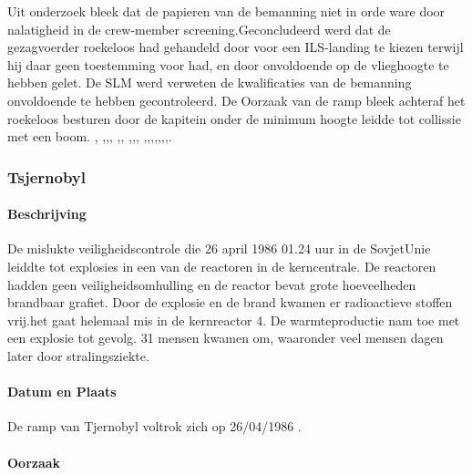 \documentclass{article}
\begin{document}
	Uit onderzoek bleek dat de papieren van de bemanning niet in orde ware door nalatigheid in de crew-member screening.Geconcludeerd werd dat de gezagvoerder roekeloos had gehandeld door voor een ILS-landing te kiezen terwijl hij daar geen toestemming voor had, en door onvoldoende op de vlieghoogte te hebben gelet. 
	De SLM werd verweten de kwalificaties van de bemanning onvoldoende te hebben gecontroleerd. De Oorzaak van de ramp bleek achteraf het roekeloos besturen door de kapitein onder de minimum hoogte leidde tot collissie met een boom.
	\cite{espnSLMterugblik},\cite{dennisRosier01052020}
	\cite{hassing07062020slmramp},\cite{amsterdamArchiefSLM},\cite{rtvOost06062019nabestaande},
	\cite{breda07062021AndroSnel},\cite{andereTijdenSLMCrash},
	\cite{aviationReport},\cite{aviationSLMCrashAccidentInvestigation},\cite{mcDonnelDouglasCommissionReportSLMCrash},
	\cite{wikiSRFlight764},\cite{nos07062019SLMTerugblik},\cite{dagvantoenSLMCrash},\cite{waterkantNesty07061989},\cite{eduNandlalSRCrash},\cite{oldjetsSRAirways},\cite{cloudberg02012021srflight764},\cite{apnews07061989srplanecrash}.
	\subsubsection{Tsjernobyl}
	\paragraph{Beschrijving}
		De mislukte veiligheidscontrole die 26 april 1986 01.24 uur in de SovjetUnie leiddte tot explosies in een van de reactoren in de kerncentrale. De reactoren hadden geen veiligheidsomhulling en de reactor bevat grote hoeveelheden brandbaar grafiet. Door de explosie en de brand kwamen er radioactieve stoffen vrij.het gaat helemaal mis in de kernreactor 4. De warmteproductie nam  toe met een explosie tot gevolg. 31 mensen kwamen om, waaronder veel mensen dagen later door stralingsziekte.
	\paragraph{Datum en Plaats}
		 De ramp van Tjernobyl voltrok zich op 26/04/1986 \cite{INSAVienna1992Chernobyl}.
	\paragraph{Oorzaak}
	\newline \indent
\end{document}
